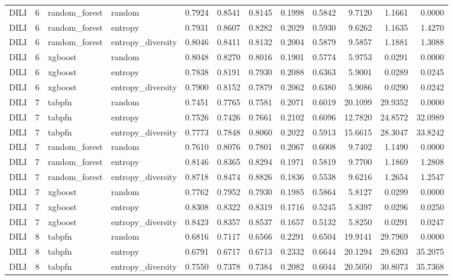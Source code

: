 \begin{tabular}{lrllrrrrrrrr}
DILI & 6 & random_forest & random & 0.7924 & 0.8541 & 0.8145 & 0.1998 & 0.5842 & 9.7120 & 1.1661 & 0.0000 \\
DILI & 6 & random_forest & entropy & 0.7931 & 0.8607 & 0.8282 & 0.2029 & 0.5930 & 9.6262 & 1.1635 & 1.4270 \\
DILI & 6 & random_forest & entropy_diversity & 0.8046 & 0.8411 & 0.8132 & 0.2004 & 0.5879 & 9.5857 & 1.1881 & 1.3088 \\
DILI & 6 & xgboost & random & 0.8048 & 0.8270 & 0.8016 & 0.1901 & 0.5774 & 5.9753 & 0.0291 & 0.0000 \\
DILI & 6 & xgboost & entropy & 0.7838 & 0.8191 & 0.7930 & 0.2088 & 0.6363 & 5.9001 & 0.0289 & 0.0245 \\
DILI & 6 & xgboost & entropy_diversity & 0.7900 & 0.8152 & 0.7879 & 0.2062 & 0.6380 & 5.9086 & 0.0290 & 0.0242 \\
DILI & 7 & tabpfn & random & 0.7451 & 0.7765 & 0.7581 & 0.2071 & 0.6019 & 20.1099 & 29.9352 & 0.0000 \\
DILI & 7 & tabpfn & entropy & 0.7526 & 0.7426 & 0.7661 & 0.2102 & 0.6096 & 12.7820 & 24.8572 & 32.0989 \\
DILI & 7 & tabpfn & entropy_diversity & 0.7773 & 0.7848 & 0.8060 & 0.2022 & 0.5913 & 15.6615 & 28.3047 & 33.8242 \\
DILI & 7 & random_forest & random & 0.7610 & 0.8076 & 0.7801 & 0.2067 & 0.6008 & 9.7402 & 1.1490 & 0.0000 \\
DILI & 7 & random_forest & entropy & 0.8146 & 0.8365 & 0.8294 & 0.1971 & 0.5819 & 9.7700 & 1.1869 & 1.2808 \\
DILI & 7 & random_forest & entropy_diversity & 0.8718 & 0.8474 & 0.8826 & 0.1836 & 0.5538 & 9.6216 & 1.2654 & 1.2547 \\
DILI & 7 & xgboost & random & 0.7762 & 0.7952 & 0.7930 & 0.1985 & 0.5864 & 5.8127 & 0.0299 & 0.0000 \\
DILI & 7 & xgboost & entropy & 0.8308 & 0.8322 & 0.8319 & 0.1716 & 0.5245 & 5.8397 & 0.0296 & 0.0250 \\
DILI & 7 & xgboost & entropy_diversity & 0.8423 & 0.8357 & 0.8537 & 0.1657 & 0.5132 & 5.8250 & 0.0291 & 0.0247 \\
DILI & 8 & tabpfn & random & 0.6816 & 0.7117 & 0.6566 & 0.2291 & 0.6504 & 19.9141 & 29.7969 & 0.0000 \\
DILI & 8 & tabpfn & entropy & 0.6791 & 0.6717 & 0.6713 & 0.2332 & 0.6644 & 20.1294 & 29.6203 & 35.2075 \\
DILI & 8 & tabpfn & entropy_diversity & 0.7550 & 0.7378 & 0.7384 & 0.2082 & 0.6044 & 20.5050 & 30.8073 & 35.7368 \\

\end{tabular}
